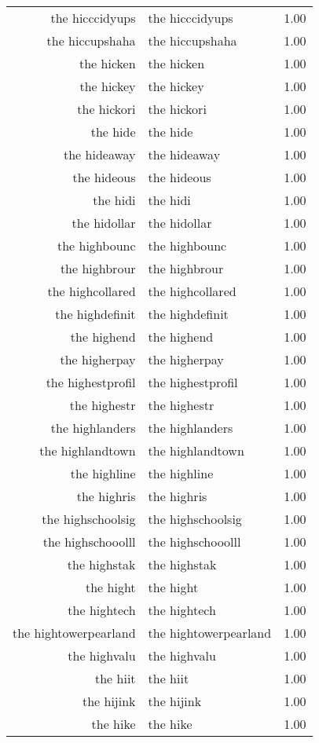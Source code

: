\begin{table}[ht]
\begin{tabular}{rlr}
  the hicccidyups & the hicccidyups & 1.00 \\ 
  the hiccupshaha & the hiccupshaha & 1.00 \\ 
  the hicken & the hicken & 1.00 \\ 
  the hickey & the hickey & 1.00 \\ 
  the hickori & the hickori & 1.00 \\ 
  the hide & the hide & 1.00 \\ 
  the hideaway & the hideaway & 1.00 \\ 
  the hideous & the hideous & 1.00 \\ 
  the hidi & the hidi & 1.00 \\ 
  the hidollar & the hidollar & 1.00 \\ 
  the highbounc & the highbounc & 1.00 \\ 
  the highbrour & the highbrour & 1.00 \\ 
  the highcollared & the highcollared & 1.00 \\ 
  the highdefinit & the highdefinit & 1.00 \\ 
  the highend & the highend & 1.00 \\ 
  the higherpay & the higherpay & 1.00 \\ 
  the highestprofil & the highestprofil & 1.00 \\ 
  the highestr & the highestr & 1.00 \\ 
  the highlanders & the highlanders & 1.00 \\ 
  the highlandtown & the highlandtown & 1.00 \\ 
  the highline & the highline & 1.00 \\ 
  the highris & the highris & 1.00 \\ 
  the highschoolsig & the highschoolsig & 1.00 \\ 
  the highschooolll & the highschooolll & 1.00 \\ 
  the highstak & the highstak & 1.00 \\ 
  the hight & the hight & 1.00 \\ 
  the hightech & the hightech & 1.00 \\ 
  the hightowerpearland & the hightowerpearland & 1.00 \\ 
  the highvalu & the highvalu & 1.00 \\ 
  the hiit & the hiit & 1.00 \\ 
  the hijink & the hijink & 1.00 \\ 
  the hike & the hike & 1.00 \\ 

\end{tabular}
\end{table}
